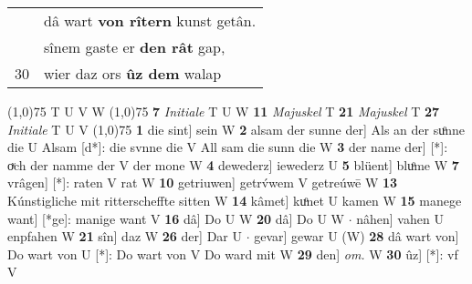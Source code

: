 \documentclass[8pt,a4paper,notitlepage]{article}
\begin{document}
\begin{table}[ht]
\begin{minipage}[t]{0.5\linewidth}
\begin{tabular}{rl}
 & dâ wart \textbf{von rîtern} kunst getân.\\ 
 & sînem gaste er \textbf{den rât} gap,\\ 
30 & wier daz ors \textbf{ûz dem} walap\\ 
\end{tabular}
\scriptsize
\line(1,0){75} \newline
T U V W \newline
\line(1,0){75} \newline
\textbf{7} \textit{Initiale} T U W  \textbf{11} \textit{Majuskel} T  \textbf{21} \textit{Majuskel} T  \textbf{27} \textit{Initiale} T U V  \newline
\line(1,0){75} \newline
\textbf{1} die sint] sein W \textbf{2} alsam der sunne der] Als an der suͦnne die U Alsam [d*]: die svnne die V All sam die sunn die W \textbf{3} der name der] [*]: oͮch der namme der V der mone W \textbf{4} dewederz] iewederz U \textbf{5} blüent] bluͦme W \textbf{7} vrâgen] [*]: raten V rat W \textbf{10} getriuwen] getrv́wem V getreúwē W \textbf{13} Kúnstigliche mit ritterscheffte sitten W \textbf{14} kâmet] kuͦnet U kamen W \textbf{15} manege want] [*ge]: manige want V \textbf{16} dâ] Do U W \textbf{20} dâ] Do U W  $\cdot$ nâhen] vahen U enpfahen W \textbf{21} sîn] daz W \textbf{26} der] Dar U  $\cdot$ gevar] gewar U (W) \textbf{28} dâ wart von] Do wart von U [*]: Do wart von V Do ward mit W \textbf{29} den] \textit{om.} W \textbf{30} ûz] [*]: vf V \newline
\end{minipage}
\end{table}
\end{document}
